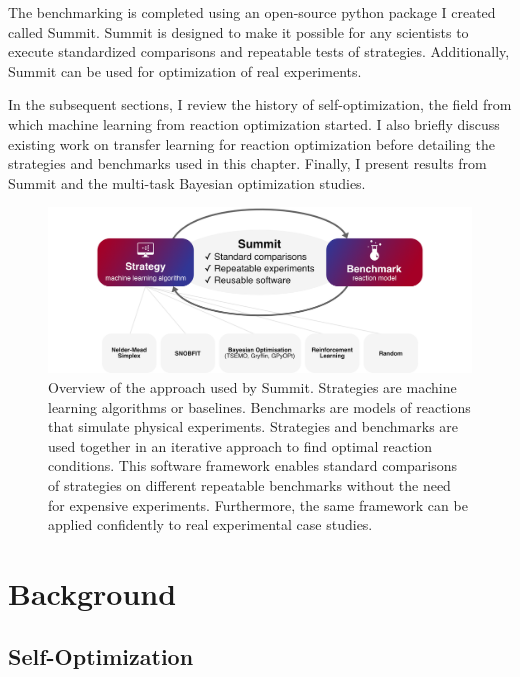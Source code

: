 The benchmarking is completed using an open-source python package I created called Summit. Summit is designed to make it possible for any scientists to execute standardized comparisons and repeatable tests of strategies. Additionally, Summit can be used for optimization of real experiments.


In the subsequent sections, I review the history of self-optimization, the field from which machine learning from reaction optimization started. I also briefly discuss existing work on transfer learning for reaction optimization before detailing the strategies and benchmarks used in this chapter. Finally, I present results from Summit and the multi-task Bayesian optimization studies.

\begin{figure}
    \centering
    \includegraphics[width=\textwidth]{gfx/Chapter03/overview.png}
    \caption{Overview of the approach used by Summit. Strategies are machine learning algorithms or baselines. Benchmarks are models of reactions that simulate physical experiments. Strategies and benchmarks are used together in an iterative approach to find optimal reaction conditions. This software framework enables standard comparisons of strategies on different repeatable benchmarks without the need for expensive experiments. Furthermore, the same framework can be applied confidently to real experimental case studies.}
    \label{fig:overview}
\end{figure}

\section{Background}

\subsection{Self-Optimization}

